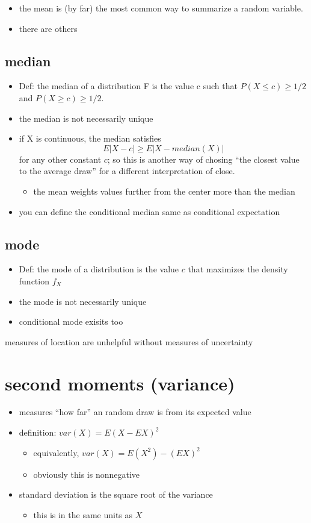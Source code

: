 \documentclass[11pt]{article}
\begin{document}
\begin{itemize}
\item the mean is (by far) the most common way to summarize a random variable.
\item there are others
\end{itemize}
\subsection{median}
\label{sec-2-1}

\begin{itemize}
\item Def: the median of a distribution F is the value c such that $P(X
       \leq c) \geq 1/2$ and $P(X \geq c) \geq 1/2$.
\item the median is not necessarily unique
\item if X is continuous, the median satisfies 
       \[ E | X - c | \geq E | X - median(X) | \]
       for any other constant $c$; so this is another way of chosing
       ``the closest value to the average draw'' for a different
       interpretation of close.
\begin{itemize}
\item the mean weights values further from the center more than
         the median
\end{itemize}
\item you can define the conditional median same as conditional expectation
\end{itemize}
\subsection{mode}
\label{sec-2-2}

\begin{itemize}
\item Def: the mode of a distribution is the value $c$ that maximizes
       the density function $f_X$
\item the mode is not necessarily unique
\item conditional mode exisits too
\end{itemize}
     measures of location are unhelpful without measures of uncertainty
\section{second moments (variance)}
\label{sec-3}

\begin{itemize}
\item measures ``how far'' an random draw is from its expected value
\item definition: $var(X) = E(X - E X)^2$
\begin{itemize}
\item equivalently, $var(X) = E(X^2) - (EX)^2$
\item obviously this is nonnegative
\end{itemize}
\item standard deviation is the square root of the variance
\begin{itemize}
\item this is in the same units as $X$
\end{itemize}
\end{itemize}
\end{document}
